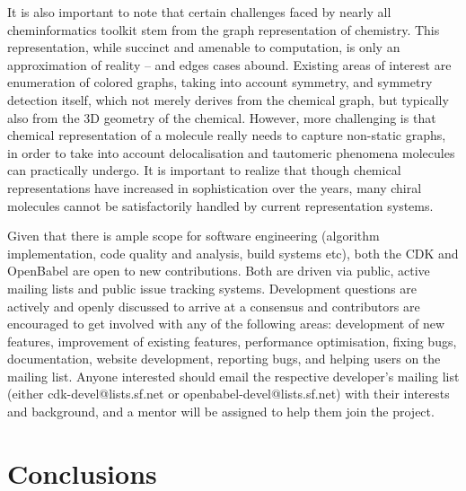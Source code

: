 \documentclass{sig-alternate}
\begin{document}
It is also important to note that certain challenges faced by nearly
all cheminformatics toolkit stem from the graph representation of
chemistry. This representation, while succinct and amenable to
computation, is only an approximation of reality -- and edges cases
abound. Existing areas of interest are enumeration of colored graphs,
taking into account symmetry, and symmetry detection itself, which not
merely derives from the chemical graph, but typically also from the 3D
geometry of the chemical. However, more challenging is that chemical
representation of a molecule really needs to capture non-static
graphs, in order to take into account delocalisation and tautomeric
phenomena molecules can practically undergo. It is important to
realize that though chemical representations have increased in
sophistication over the years, many chiral molecules cannot be
satisfactorily handled by current representation systems.


Given that there is ample scope for software engineering (algorithm
implementation, code quality and analysis, build systems etc), both
the CDK and OpenBabel are open to new contributions. Both are driven
via public, active mailing lists and public issue tracking systems.
Development questions are actively and openly discussed to arrive at a
consensus and contributors are encouraged to get involved with any of
the following areas: development of new features, improvement of
existing features, performance optimisation, fixing bugs,
documentation, website development, reporting bugs, and helping users
on the mailing list. Anyone interested should email the respective
developer’s mailing list (either cdk-devel@lists.sf.net or
openbabel-devel@lists.sf.net) with their interests and background, and
a mentor will be assigned to help them join the project.



\section{Conclusions}
\label{sec:conclusions}



  
  
\end{document}
